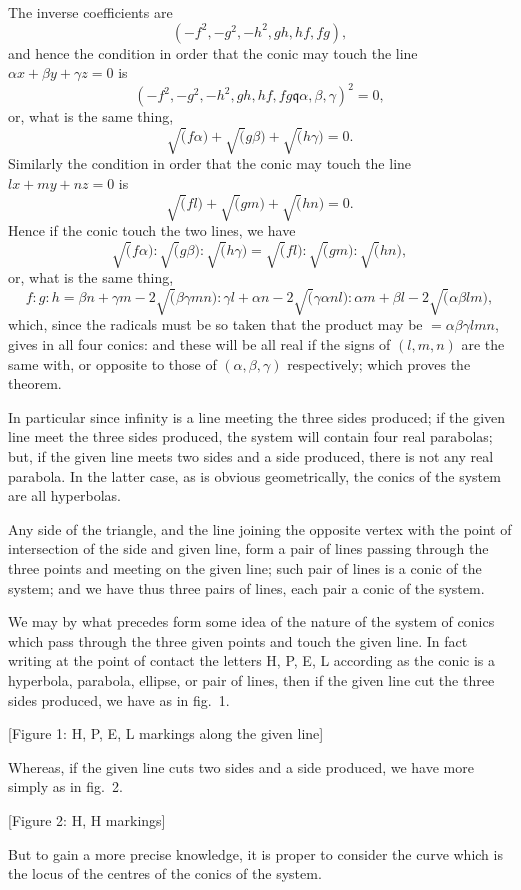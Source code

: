 \documentclass[11pt,a4paper]{article}
\theoremstyle{definition}
\begin{document}
The inverse coefficients are
\[
(-f^2, -g^2, -h^2, gh, hf, fg),
\]
and hence the condition in order that the conic may touch the line $\alpha x + \beta y + \gamma z = 0$ is
\[
(-f^2, -g^2, -h^2, gh, hf, fg \mathbin{\mathfrak{q}} \alpha, \beta, \gamma)^2 = 0,
\]
or, what is the same thing,
\[
\sqrt(f\alpha) + \sqrt(g\beta) + \sqrt(h\gamma) = 0.
\]
Similarly the condition in order that the conic may touch the line $lx + my + nz = 0$ is
\[
\sqrt(fl) + \sqrt(gm) + \sqrt(hn) = 0.
\]
Hence if the conic touch the two lines, we have
\[
\sqrt(f\alpha) : \sqrt(g\beta) : \sqrt(h\gamma)
= \sqrt(fl) : \sqrt(gm) : \sqrt(hn),
\]
or, what is the same thing,
\[
f : g : h = \beta n + \gamma m - 2\sqrt(\beta\gamma mn)
: \gamma l + \alpha n - 2\sqrt(\gamma\alpha nl)
: \alpha m + \beta l - 2\sqrt(\alpha\beta lm),
\]
which, since the radicals must be so taken that the product may be $= \alpha\beta\gamma lmn$,
gives in all four conics: and these will be all real if the signs of $(l, m, n)$ are the same
with, or opposite to those of $(\alpha, \beta, \gamma)$ respectively; which proves the theorem.

In particular since infinity is a line meeting the three sides produced; if the
given line meet the three sides produced, the system will contain four real parabolas;
but, if the given line meets two sides and a side produced, there is not any real
parabola. In the latter case, as is obvious geometrically, the conics of the system are
all hyperbolas.

Any side of the triangle, and the line joining the opposite vertex with the point
of intersection of the side and given line, form a pair of lines passing through the
three points and meeting on the given line; such pair of lines is a conic of the
system; and we have thus three pairs of lines, each pair a conic of the system.

We may by what precedes form some idea of the nature of the system of conics
which pass through the three given points and touch the given line. In fact writing
at the point of contact the letters H, P, E, L according as the conic is a hyperbola,
parabola, ellipse, or pair of lines, then if the given line cut the three sides produced,
we have as in fig.~1.

[Figure 1: H, P, E, L markings along the given line]

Whereas, if the given line cuts two sides and a side produced, we have more
simply as in fig.~2.

[Figure 2: H, H markings]

But to gain a more precise knowledge, it is proper to consider the curve which
is the locus of the centres of the conics of the system.
\end{document}
